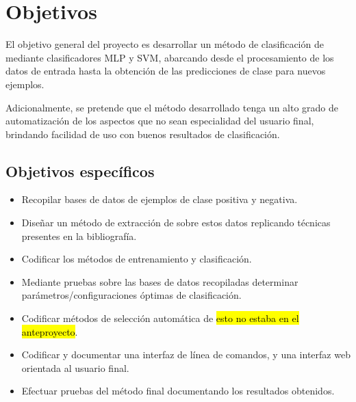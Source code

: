 %
%
%
\section{Objetivos}
%
El objetivo general del proyecto es desarrollar un método de
clasificación de  mediante clasificadores MLP y SVM,
abarcando desde el procesamiento de los datos de entrada hasta la
obtención de las predicciones de clase para nuevos ejemplos.

Adicionalmente, se pretende que el método desarrollado tenga un alto
grado de automatización de los aspectos que no sean especialidad del
usuario final, brindando facilidad de uso con buenos resultados de
clasificación.
%
%
\subsection{Objetivos específicos}
%
\begin{itemize}
\item Recopilar bases de datos de ejemplos de clase positiva y
  negativa.
\item Diseñar un método de extracción de  sobre estos datos
  replicando técnicas presentes en la bibliografía.
\item Codificar los métodos de entrenamiento y clasificación.
\item Mediante pruebas sobre las bases de datos recopiladas determinar
  parámetros/configuraciones óptimas de clasificación.
\item Codificar métodos de selección automática de 
  \hl{esto no estaba en el anteproyecto}.
\item Codificar y documentar una interfaz de línea de comandos, y una
  interfaz web orientada al usuario final.
\item Efectuar pruebas del método final documentando los resultados
  obtenidos.
\end{itemize}
